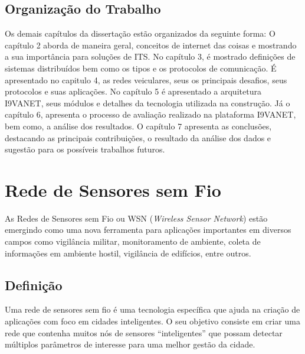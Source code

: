 \documentclass[
	12pt,				%
	oneside,			%
	a4paper,			%
	english,			%
	brazil				%
	]{abntex2ppgsi}
\begin{document}
\section{Organização do Trabalho}
Os demais capítulos da dissertação estão organizados da seguinte forma:
O capítulo 2 aborda de maneira geral, conceitos de internet das coisas e mostrando a sua importância para soluções de ITS. No capítulo 3, é mostrado definições de sistemas distribuídos bem como os tipos e os protocolos de comunicação. É apresentado no capitulo 4, as redes veiculares, seus os principais desafios, seus protocolos  e suas aplicações. No capítulo 5 é apresentado a arquitetura I9VANET, seus módulos e detalhes da tecnologia utilizada na construção. Já o capítulo 6, apresenta o processo de avaliação realizado na plataforma I9VANET, bem como, a análise dos resultados. O capítulo 7 apresenta as conclusões, destacando as principais contribuições, o resultado da análise dos dados e sugestão para os possíveis trabalhos futuros.


\chapter{Rede de Sensores sem Fio}

As Redes de Sensores sem Fio ou WSN (\textit{Wireless Sensor Network}) estão emergindo como uma nova ferramenta para aplicações importantes em diversos campos como vigilância militar, monitoramento de ambiente,  coleta de informações em ambiente hostil, vigilância de edifícios, entre outros. 

\section{Definição}
Uma rede de sensores sem fio é uma tecnologia específica que ajuda na criação de aplicações com foco em cidades inteligentes. O seu objetivo consiste em criar uma rede que contenha muitos nós de sensores ``inteligentes'' que possam detectar múltiplos parâmetros de interesse para uma melhor gestão da cidade.
\end{document}
